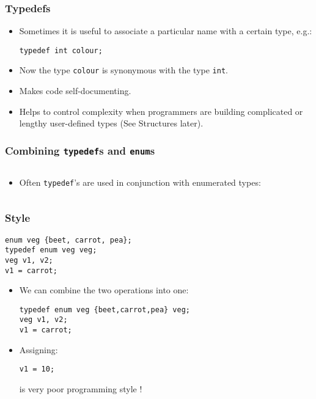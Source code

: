 \begin{frame}[fragile]
\frametitle{Typedefs}

\begin{itemize}[<+->]
\item Sometimes it is useful to associate a particular name with
a certain type, e.g.:
\begin{verbatim}
typedef int colour;
\end{verbatim}
\item Now the type \verb^colour^ is synonymous with the type \verb^int^.
\item Makes code self-documenting.
\item Helps to control complexity when programmers are building
complicated or lengthy user-defined types (See Structures later).
\end{itemize}
\end{frame}

\begin{frame}[fragile]
\frametitle{Combining {\tt typedef}s and {\tt enum}s}
\begin{columns}

\begin{column}{0.45\textwidth}
\begin{itemize}[<+->]
\item Often \verb^typedef^'s are used in conjunction with enumerated types:
\end{itemize}


\end{column}

\begin{column}{0.45\textwidth}

\end{column}

\end{columns}
\end{frame}

\begin{frame}[fragile]
\frametitle{Style}

\begin{verbatim}
enum veg {beet, carrot, pea};
typedef enum veg veg;
veg v1, v2;
v1 = carrot;
\end{verbatim}
\begin{itemize}[<+->]
\item We can combine the two operations into one:
{\small
\begin{verbatim}
typedef enum veg {beet,carrot,pea} veg;
veg v1, v2;
v1 = carrot;
\end{verbatim}
}
\item Assigning:
\begin{verbatim}
v1 = 10;
\end{verbatim}
is very poor programming style !
\end{itemize}
\end{frame}


